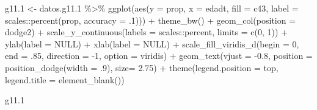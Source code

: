 \documentclass[
  12pt,
]{book}
\newenvironment{Shaded}{\begin{snugshade}}{\end{snugshade}}
\newcommand{\AttributeTok}[1]{\textcolor[rgb]{0.77,0.63,0.00}{#1}}
\newcommand{\ConstantTok}[1]{\textcolor[rgb]{0.00,0.00,0.00}{#1}}
\newcommand{\DecValTok}[1]{\textcolor[rgb]{0.00,0.00,0.81}{#1}}
\newcommand{\FloatTok}[1]{\textcolor[rgb]{0.00,0.00,0.81}{#1}}
\newcommand{\FunctionTok}[1]{\textcolor[rgb]{0.00,0.00,0.00}{#1}}
\newcommand{\NormalTok}[1]{#1}
\newcommand{\OtherTok}[1]{\textcolor[rgb]{0.56,0.35,0.01}{#1}}
\newcommand{\SpecialCharTok}[1]{\textcolor[rgb]{0.00,0.00,0.00}{#1}}
\newcommand{\StringTok}[1]{\textcolor[rgb]{0.31,0.60,0.02}{#1}}
\begin{document}
\begin{Shaded}
\begin{Highlighting}[]
\NormalTok{g11}\FloatTok{.1} \OtherTok{\textless{}{-}}\NormalTok{ datos.g11}\FloatTok{.1} \SpecialCharTok{\%\textgreater{}\%} 
  \FunctionTok{ggplot}\NormalTok{(}\FunctionTok{aes}\NormalTok{(}\AttributeTok{y =}\NormalTok{ prop, }\AttributeTok{x =}\NormalTok{ edadt, }\AttributeTok{fill =}\NormalTok{ c43, }
             \AttributeTok{label =}\NormalTok{ scales}\SpecialCharTok{::}\FunctionTok{percent}\NormalTok{(prop, }\AttributeTok{accuracy =}\NormalTok{ .}\DecValTok{1}\NormalTok{))) }\SpecialCharTok{+}
  \FunctionTok{theme\_bw}\NormalTok{() }\SpecialCharTok{+} 
  \FunctionTok{geom\_col}\NormalTok{(}\AttributeTok{position =} \StringTok{\textquotesingle{}dodge2\textquotesingle{}}\NormalTok{) }\SpecialCharTok{+}
  \FunctionTok{scale\_y\_continuous}\NormalTok{(}\AttributeTok{labels =}\NormalTok{ scales}\SpecialCharTok{::}\NormalTok{percent,}
                     \AttributeTok{limits =} \FunctionTok{c}\NormalTok{(}\DecValTok{0}\NormalTok{, }\DecValTok{1}\NormalTok{)) }\SpecialCharTok{+}
  \FunctionTok{ylab}\NormalTok{(}\AttributeTok{label =} \ConstantTok{NULL}\NormalTok{) }\SpecialCharTok{+}
  \FunctionTok{xlab}\NormalTok{(}\AttributeTok{label =} \ConstantTok{NULL}\NormalTok{) }\SpecialCharTok{+}
  \FunctionTok{scale\_fill\_viridis\_d}\NormalTok{(}\AttributeTok{begin =} \DecValTok{0}\NormalTok{, }\AttributeTok{end =}\NormalTok{ .}\DecValTok{85}\NormalTok{, }\AttributeTok{direction =} \SpecialCharTok{{-}}\DecValTok{1}\NormalTok{, }\AttributeTok{option =} \StringTok{\textquotesingle{}viridis\textquotesingle{}}\NormalTok{) }\SpecialCharTok{+}
  \FunctionTok{geom\_text}\NormalTok{(}\AttributeTok{vjust =} \SpecialCharTok{{-}}\FloatTok{0.8}\NormalTok{,}
            \AttributeTok{position =} \FunctionTok{position\_dodge}\NormalTok{(}\AttributeTok{width =}\NormalTok{ .}\DecValTok{9}\NormalTok{),}
            \AttributeTok{size=} \FloatTok{2.75}\NormalTok{)  }\SpecialCharTok{+} 
  \FunctionTok{theme}\NormalTok{(}\AttributeTok{legend.position =} \StringTok{\textquotesingle{}top\textquotesingle{}}\NormalTok{,}
        \AttributeTok{legend.title =} \FunctionTok{element\_blank}\NormalTok{()) }

\NormalTok{g11}\FloatTok{.1}
\end{Highlighting}
\end{Shaded}
\end{document}
